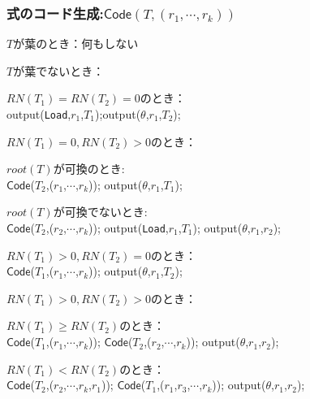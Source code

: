 \documentclass[ckj,dvipdfmx]{beamer}
\begin{document}
\begin{frame}
  \frametitle{式のコード生成:$\mathsf{Code}(T,(r_1,\cdots,r_k))$}
  {\scriptsize
  \begin{list}{}{}
    \item $T$が葉のとき：何もしない
    \item $T$が葉でないとき：
    \begin{list}{}{}
      \item $RN(T_1)=RN(T_2)=0$のとき：\\
      \quad output(\texttt{Load},$r_1$,$T_1$);output($\theta$,$r_1$,$T_2$);
      \item $RN(T_1)=0,RN(T_2)>0$のとき：
      \begin{list}{}{}
        \item $root(T)$が可換のとき:\\
        \quad $\mathsf{Code}$($T_2$,($r_1$,$\cdots$,$r_k$));
        output($\theta$,$r_1$,$T_1$);
        \item $root(T)$が可換でないとき:\\
        \quad $\mathsf{Code}$($T_2$,($r_2$,$\cdots$,$r_k$));
        output(\texttt{Load},$r_1$,$T_1$);
        output($\theta$,$r_1$,$r_2$);
      \end{list}
      \item $RN(T_1)>0,RN(T_2)=0$のとき：\\
      \quad $\mathsf{Code}$($T_1$,($r_1$,$\cdots$,$r_k$));
      output($\theta$,$r_1$,$T_2$);
      \item $RN(T_1)>0,RN(T_2)>0$のとき：
      \begin{list}{}{}
        \item $RN(T_1)\geq RN(T_2)$のとき：\\
        \quad $\mathsf{Code}$($T_1$,($r_1$,$\cdots$,$r_k$));
        $\mathsf{Code}$($T_2$,($r_2$,$\cdots$,$r_k$));
        output($\theta$,$r_1$,$r_2$);
        \item $RN(T_1)<RN(T_2)$のとき：\\
        \quad $\mathsf{Code}$($T_2$,($r_2$,$\cdots$,$r_k$,$r_1$));
        $\mathsf{Code}$($T_1$,($r_1$,$r_3$,$\cdots$,$r_k$));
        output($\theta$,$r_1$,$r_2$);
      \end{list}
    \end{list}
  \end{list}
  }
\end{frame}
\end{document}
